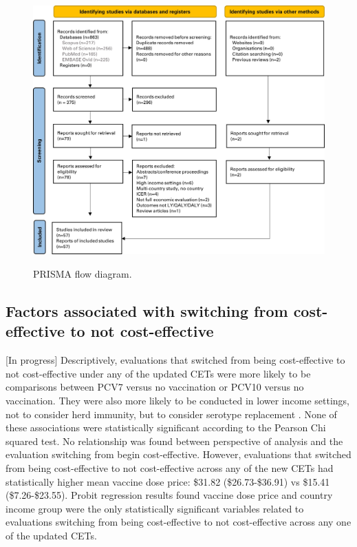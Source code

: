 \documentclass[12pt]{article}
\begin{document}
\begin{figure}[H]
    \centering
    \includegraphics[width=1\linewidth]{figures/prisma-flow-diagram.jpg}
    \caption{PRISMA flow diagram.}
    \label{fig:prisma-flow-diagram}
    \caption*{\footnotesize \textit{}}
\end{figure}

\subsection{Factors associated with switching from cost-effective to not cost-effective}
[In progress]
Descriptively, evaluations that switched from being cost-effective to not cost-effective under any of the updated CETs were more likely to be comparisons between PCV7 versus no vaccination or PCV10 versus no vaccination. They were also more likely to be conducted in lower income settings, not to consider herd immunity, but to consider serotype replacement . None of these associations were statistically significant according to the Pearson Chi squared test. No relationship was found between perspective of analysis and the evaluation switching from begin cost-effective. However, evaluations that switched from being cost-effective to not cost-effective across any of the new CETs had statistically higher mean vaccine dose price: \$31.82 (\$26.73-\$36.91) vs \$15.41 (\$7.26-\$23.55).  Probit regression results found vaccine dose price and country income group were the only statistically significant variables related to evaluations switching from being cost-effective to not cost-effective across any one of the updated CETs.
\end{document}
